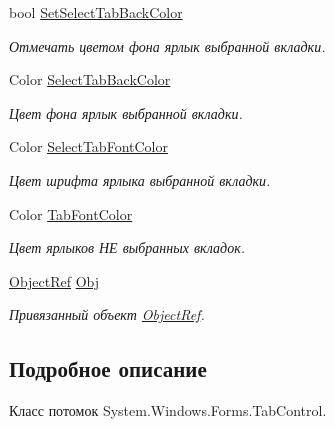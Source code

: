 \begin{DoxyCompactItemize}
bool \mbox{\hyperlink{class_f_b_a_1_1_tab_control_f_b_a_a8446dc73e7d507a9f29714614a694d10}{Set\+Select\+Tab\+Back\+Color}}
\begin{DoxyCompactList}\small\item\em Отмечать цветом фона ярлык выбранной вкладки. \end{DoxyCompactList}\item 
Color \mbox{\hyperlink{class_f_b_a_1_1_tab_control_f_b_a_a06d33393d5852c16d793ea1d38ec14ac}{Select\+Tab\+Back\+Color}}
\begin{DoxyCompactList}\small\item\em Цвет фона ярлык выбранной вкладки. \end{DoxyCompactList}\item 
Color \mbox{\hyperlink{class_f_b_a_1_1_tab_control_f_b_a_acd5f432df6e6a5f59f83f3981a42c6e5}{Select\+Tab\+Font\+Color}}
\begin{DoxyCompactList}\small\item\em Цвет шрифта ярлыка выбранной вкладки. \end{DoxyCompactList}\item 
Color \mbox{\hyperlink{class_f_b_a_1_1_tab_control_f_b_a_aeab8d61d5db0da9fe4c5d942145d425a}{Tab\+Font\+Color}}
\begin{DoxyCompactList}\small\item\em Цвет ярлыков НЕ выбранных вкладок. \end{DoxyCompactList}\item 
\mbox{\hyperlink{class_f_b_a_1_1_object_ref}{Object\+Ref}} \mbox{\hyperlink{class_f_b_a_1_1_tab_control_f_b_a_a1039c55f157d3c7706bd21c86df216bf}{Obj}}
\begin{DoxyCompactList}\small\item\em Привязанный объект \mbox{\hyperlink{class_f_b_a_1_1_object_ref}{Object\+Ref}}. \end{DoxyCompactList}\end{DoxyCompactItemize}


\subsection{Подробное описание}
Класс потомок System.\+Windows.\+Forms.\+Tab\+Control. 



